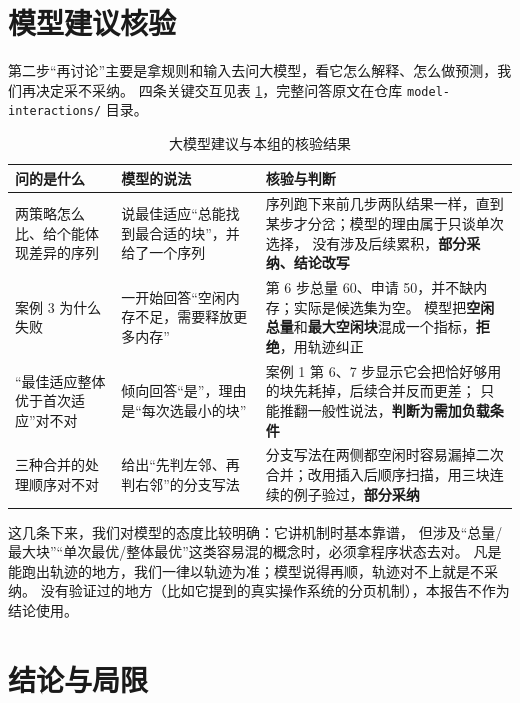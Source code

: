 \documentclass[12pt,a4paper]{ctexart}
\begin{document}
\section{模型建议核验}\label{sec:llm}

第二步“再讨论”主要是拿规则和输入去问大模型，看它怎么解释、怎么做预测，我们再决定采不采纳。
四条关键交互见表 \ref{tab:llm}，完整问答原文在仓库 \texttt{model-interactions/} 目录。

\begin{table}[htbp]
    \centering
    \caption{大模型建议与本组的核验结果}
    \label{tab:llm}
    \footnotesize
    \setlength{\tabcolsep}{4pt}
    \begin{tabularx}{\textwidth}{@{}>{\raggedright\arraybackslash}p{3.5cm}>{\raggedright\arraybackslash}X>{\raggedright\arraybackslash}X@{}}
        \toprule
        问的是什么 & 模型的说法 & 核验与判断 \\
        \midrule
        两策略怎么比、给个能体现差异的序列 &
        说最佳适应“总能找到最合适的块”，并给了一个序列 &
        序列跑下来前几步两队结果一样，直到某步才分岔；模型的理由属于只谈单次选择，
        没有涉及后续累积，\textbf{部分采纳、结论改写} \\
        案例 3 为什么失败 &
        一开始回答“空闲内存不足，需要释放更多内存” &
        第 6 步总量 60、申请 50，并不缺内存；实际是候选集为空。
        模型把\textbf{空闲总量}和\textbf{最大空闲块}混成一个指标，\textbf{拒绝}，用轨迹纠正 \\
        “最佳适应整体优于首次适应”对不对 &
        倾向回答“是”，理由是“每次选最小的块” &
        案例 1 第 6、7 步显示它会把恰好够用的块先耗掉，后续合并反而更差；
        只能推翻一般性说法，\textbf{判断为需加负载条件} \\
        三种合并的处理顺序对不对 &
        给出“先判左邻、再判右邻”的分支写法 &
        分支写法在两侧都空闲时容易漏掉二次合并；改用插入后顺序扫描，用三块连续的例子验过，\textbf{部分采纳} \\
        \bottomrule
    \end{tabularx}
\end{table}

这几条下来，我们对模型的态度比较明确：它讲机制时基本靠谱，
但涉及“总量/最大块”“单次最优/整体最优”这类容易混的概念时，必须拿程序状态去对。
凡是能跑出轨迹的地方，我们一律以轨迹为准；模型说得再顺，轨迹对不上就是不采纳。
没有验证过的地方（比如它提到的真实操作系统的分页机制），本报告不作为结论使用。

\clearpage
\section{结论与局限}
\end{document}
